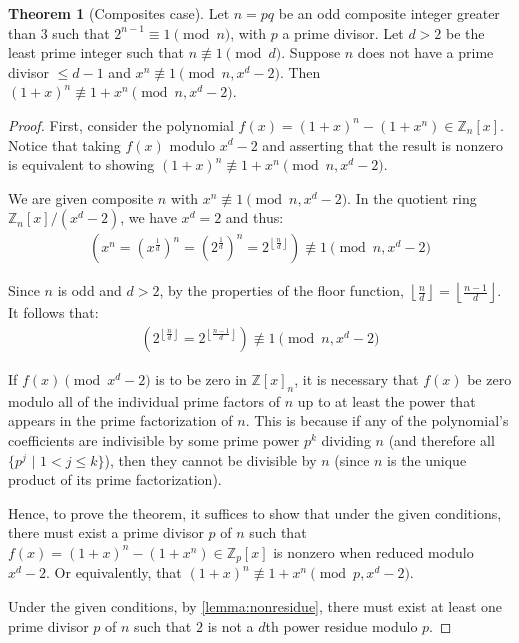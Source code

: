 \documentclass{article}
\theoremstyle{plain}
\theoremstyle{definition}
\newtheorem{theorem}{Theorem}
\begin{document}
\begin{theorem}[Composites case] \label{theorem:composites}
Let $n = pq$ be an odd composite integer greater than $3$ such that $2^{n-1} \equiv 1 \pmod{n}$, with $p$ a prime divisor. Let $d > 2$ be the least prime integer such that $n \not\equiv 1 \pmod{d}$. Suppose $n$ does not have a prime divisor $\leq d-1$ and $x^n \not\equiv 1 \pmod{n, x^d-2}$. Then $(1 + x)^n \not\equiv 1 + x^n \pmod{n, x^d-2}$.
\end{theorem}
\begin{proof}
First, consider the polynomial $f(x) = (1 + x)^n - (1 + x^n) \in \mathbb{Z}_n[x]$. Notice that taking $f(x)$ modulo $x^d - 2$ and asserting that the result is nonzero is equivalent to showing $(1 + x)^n \not\equiv 1 + x^n \pmod{n, x^d-2}$.

We are given composite $n$ with $x^n \not\equiv 1 \pmod{n, x^d-2}$. In the quotient ring $\mathbb{Z}_n[x]/(x^d-2)$, we have $x^d = 2$ and thus:
\begin{align}
    \left(x^n = (x^{\frac{1}{d}})^n = (2^{\frac{1}{d}})^n = 2^{\left\lfloor\frac{n}{d}\right\rfloor}\right) \not\equiv 1 \pmod{n,x^d-2}
\end{align}

Since $n$ is odd and $d > 2$, by the properties of the floor function, $\left\lfloor\frac{n}{d}\right\rfloor = \left\lfloor\frac{n-1}{d}\right\rfloor$. It follows that:
\begin{align}
    \left(2^{\left\lfloor\frac{n}{d}\right\rfloor} = 2^{\left\lfloor\frac{n-1}{d}\right\rfloor}\right) \not\equiv 1 \pmod{n,x^d-2}
\end{align}

If $f(x) \pmod{x^d-2}$ is to be zero in $\mathbb{Z}[x]_n$, it is necessary that $f(x)$ be zero modulo all of the individual prime factors of $n$ up to at least the power that appears in the prime factorization of $n$. This is because if any of the polynomial's coefficients are indivisible by some prime power $p^k$ dividing $n$ (and therefore all $\{ p^j \text{ | } 1 < j \leq k \}$), then they cannot be divisible by $n$ (since $n$ is the unique product of its prime factorization).

Hence, to prove the theorem, it suffices to show that under the given conditions, there must exist a prime divisor $p$ of $n$ such that $f(x) = (1 + x)^n - (1 + x^n) \in \mathbb{Z}_p[x]$ is nonzero when reduced modulo $x^d - 2$. Or equivalently, that $(1 + x)^n \not\equiv 1 + x^n \pmod{p, x^d-2}$.

Under the given conditions, by \cref{lemma:nonresidue}, there must exist at least one prime divisor $p$ of $n$ such that $2$ is not a $d$th power residue modulo $p$.


\end{proof}
\end{document}
